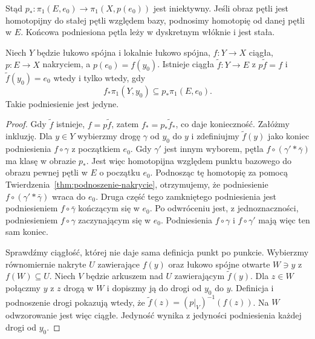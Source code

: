 Stąd $p_*:\pi_1(E,e_0)\to\pi_1(X,p(e_0))$
jest iniektywny. Jeśli obraz pętli jest
homotopijny do stałej pętli względem bazy,
podnosimy homotopię od danej pętli w $E$.
Końcowa podniesiona pętla leży w dyskretnym
włóknie i jest stała.

\begin{twierdzenie}
\label{thm:kryterium-podnoszenia}
Niech $Y$ będzie łukowo spójna i lokalnie
łukowo spójna, $f:Y\to X$ ciągła,
$p:E\to X$ nakryciem, a $p(e_0)=f(y_0)$.
Istnieje ciągła $\widetilde f:Y\to E$
z $p\widetilde f=f$ i
$\widetilde f(y_0)=e_0$ wtedy i tylko wtedy, gdy
\[
 f_*\pi_1(Y,y_0)\subseteq
 p_*\pi_1(E,e_0).
\]
Takie podniesienie jest jedyne.
\end{twierdzenie}
\begin{proof}
Gdy $\widetilde f$ istnieje,
$f=p\widetilde f$, zatem
$f_*=p_*\widetilde f_*$, co daje konieczność.
Załóżmy inkluzję. Dla $y\in Y$ wybierzmy
drogę $\gamma$ od $y_0$ do $y$ i
zdefiniujmy $\widetilde f(y)$ jako koniec
podniesienia $f\circ\gamma$ z początkiem $e_0$.
Gdy $\gamma'$ jest innym wyborem,
pętla $f\circ(\gamma'*\bar\gamma)$
ma klasę w obrazie $p_*$. Jest więc
homotopijna względem punktu bazowego
do obrazu pewnej pętli w $E$ o początku
$e_0$. Podnosząc tę homotopię za pomocą
Twierdzenia~\ref{thm:podnoszenie-nakrycie},
otrzymujemy, że podniesienie
$f\circ(\gamma'*\bar\gamma)$ wraca do $e_0$.
Druga część tego zamkniętego podniesienia jest podniesieniem
$f\circ\bar\gamma$ kończącym się w $e_0$.
Po odwróceniu jest, z jednoznaczności, podniesieniem
$f\circ\gamma$ zaczynającym się w $e_0$.
Podniesienia $f\circ\gamma$ i $f\circ\gamma'$ mają więc ten sam koniec.

Sprawdźmy ciągłość, której nie daje sama
definicja punkt po punkcie. Wybierzmy
równomiernie nakryte $U$ zawierające $f(y)$
oraz łukowo spójne otwarte $W\ni y$ z
$f(W)\subseteq U$. Niech $V$ będzie
arkuszem nad $U$ zawierającym $\widetilde f(y)$.
Dla $z\in W$ połączmy $y$ z $z$ drogą
w $W$ i dopiszmy ją do drogi od $y_0$
do $y$. Definicja i podnoszenie drogi
pokazują wtedy, że
$\widetilde f(z)=(p|_V)^{-1}(f(z))$.
Na $W$ odwzorowanie jest więc ciągłe.
Jedyność wynika z jedyności podniesienia
każdej drogi od $y_0$.
\end{proof}

